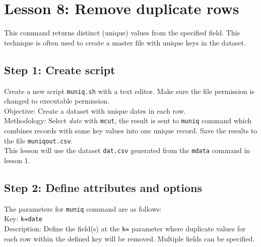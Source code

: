 

%


\section{Lesson 8: Remove duplicate rows}

This command returns distinct (unique) values from the specified field. This technique is often used to create a master file with unique keys in the dataset. 


\subsection{Step 1: Create script}

Create a new script \verb|muniq.sh| with a text editor. Make sure the file permission is changed to executable permission. \\

Objective: Create a dataset with unique dates in each row.     \\

Methodology: Select \emph{date} with \verb|mcut|, the result is sent to \verb|muniq| command which combines records with same key values into one unique record. Save the results to the file \verb|muniqout.csv|. \\

This lesson will use the dataset \verb|dat.csv| generated from the \verb|mdata| command in lesson 1.

 \subsection{Step 2: Define attributes and options }

{\setlength{\parindent}{0cm}

The parameters for \verb|muniq| command are as follows: \\

Key: 		\verb|k=date| \\
Description: 	Define the field(s) at the \verb|k=| parameter where duplicate values for each row within the defined key will be removed. Multiple fields can be specified. 

}

